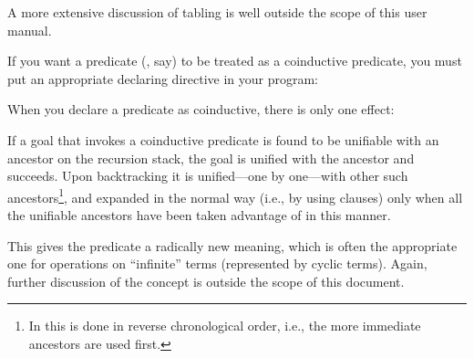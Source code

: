 A more extensive discussion of tabling is well outside the scope of this user
manual.



%
%

If you want a predicate (, say) to be treated as a coinductive
predicate, you must put an appropriate declaring directive in your
program:\\
\ind{}\label{dir:coinductive}

When you declare a predicate as coinductive, there is only one effect:
\begin{Itemize}
  \item
    If a goal that invokes a coinductive predicate is found to be unifiable
    with an ancestor on the recursion stack, the goal is unified with the
    ancestor and succeeds.  Upon backtracking it is unified---one by
    one---with other such ancestors\footnote{
      In  this is done in reverse chronological order, i.e.,
      the more immediate ancestors are used first.
    }, and expanded in the normal way (i.e., by
    using clauses) only when all the unifiable ancestors have been taken
    advantage of in this manner.
\end{Itemize}
This gives the predicate a radically new meaning, which is often the
appropriate one for operations on ``infinite'' terms (represented by cyclic
terms).  Again, further discussion of the concept is outside the scope of
this document.
